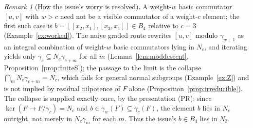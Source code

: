 \documentclass{amsart}
\theoremstyle{definition}
\theoremstyle{remark}
\newtheorem{remark}{Remark}
\begin{document}
\begin{remark}[How the issue's worry is resolved]\label{rem:issue}
A weight-$w$ basic commutator $[u,v]$ with $w>c$ need not be a visible commutator of a
weight-$c$ element; the first such case is $b=[[x_2,x_1],[x_3,x_1]]\in B_4$ relative to
$c=3$ (Example~\ref{ex:worked}). The naive graded route rewrites $[u,v]$ modulo
$\gamma_{w+1}$ as an integral combination of weight-$w$ basic commutators lying in $N_c$, and
iterating yields only $\gamma_c\subseteq N_c\gamma_{c+m}$ for all $m$
(Lemma~\ref{lem:moddescent}, Proposition~\ref{prop:finiteS}); the passage to the limit is the
collapse $\bigcap_m N_c\gamma_{c+m}=N_c$, which fails for general normal subgroups
(Example~\ref{ex:Z}) and is not implied by residual nilpotence of $F$ alone
(Proposition~\ref{prop:irreducible}). The collapse is supplied exactly once, by the
presentation (PR): since $\ker(F\to F/\gamma_c)=N_c$ and $b\in\gamma_w(F)\subseteq\gamma_c(F)$,
the element $b$ lies in $N_c$ outright, not merely in $N_c\gamma_m$ for each $m$. Thus the
issue's $b\in B_4$ lies in $N_3$.
\end{remark}
\end{document}
